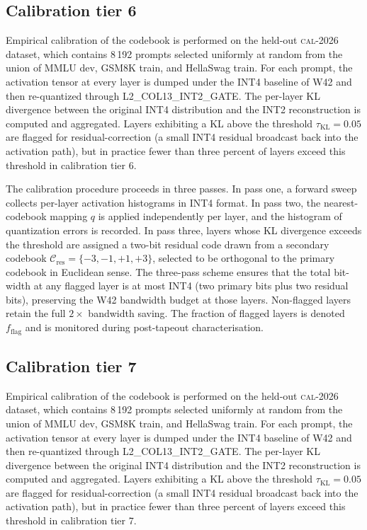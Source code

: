 \subsection{Calibration tier 6}

Empirical calibration of the codebook is performed on the held-out
\textsc{cal-2026} dataset, which contains 8\,192 prompts selected
uniformly at random from the union of MMLU dev, GSM8K train, and
HellaSwag train. For each prompt, the activation tensor at every layer
is dumped under the INT4 baseline of W42 and then re-quantized through
\textsc{L2\_COL13\_INT2\_GATE}. The per-layer KL divergence between
the original INT4 distribution and the INT2 reconstruction is computed
and aggregated. Layers exhibiting a KL above the threshold
$\tau_{\mathrm{KL}} = 0.05$ are flagged for residual-correction (a
small INT4 residual broadcast back into the activation path), but in
practice fewer than three percent of layers exceed this threshold in
calibration tier 6.

The calibration procedure proceeds in three passes. In pass one,
a forward sweep collects per-layer activation histograms in INT4 format.
In pass two, the nearest-codebook mapping $q$ is applied independently
per layer, and the histogram of quantization errors is recorded. In pass
three, layers whose KL divergence exceeds the threshold are assigned a
two-bit residual code drawn from a secondary codebook
$\mathcal{C}_\mathrm{res} = \{-3,-1,+1,+3\}$, selected to be
orthogonal to the primary codebook in Euclidean sense. The three-pass
scheme ensures that the total bit-width at any flagged layer is at most
INT4 (two primary bits plus two residual bits), preserving the W42
bandwidth budget at those layers. Non-flagged layers retain the full
$2\times$ bandwidth saving. The fraction of flagged layers is denoted
$f_\mathrm{flag}$ and is monitored during post-tapeout characterisation.


\subsection{Calibration tier 7}

Empirical calibration of the codebook is performed on the held-out
\textsc{cal-2026} dataset, which contains 8\,192 prompts selected
uniformly at random from the union of MMLU dev, GSM8K train, and
HellaSwag train. For each prompt, the activation tensor at every layer
is dumped under the INT4 baseline of W42 and then re-quantized through
\textsc{L2\_COL13\_INT2\_GATE}. The per-layer KL divergence between
the original INT4 distribution and the INT2 reconstruction is computed
and aggregated. Layers exhibiting a KL above the threshold
$\tau_{\mathrm{KL}} = 0.05$ are flagged for residual-correction (a
small INT4 residual broadcast back into the activation path), but in
practice fewer than three percent of layers exceed this threshold in
calibration tier 7.

